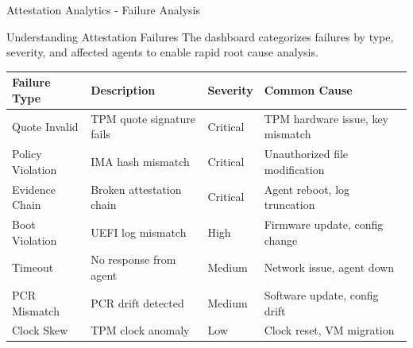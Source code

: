 \begin{frame}{Attestation Analytics - Failure Analysis}
  \begin{block}{Understanding Attestation Failures}
    \scriptsize
    The dashboard categorizes failures by type, severity, and affected agents to enable
    rapid root cause analysis.
  \end{block}

  \vspace{0.1cm}

  \scriptsize
  \begin{center}
    \begin{tabular}{|l|p{3cm}|l|p{3cm}|}
      \hline
      \textbf{Failure Type} & \textbf{Description} & \textbf{Severity} & \textbf{Common Cause} \\
      \hline
      \hline
      Quote Invalid & TPM quote signature fails & \textcolor{dangered}{Critical} & TPM hardware issue, key mismatch \\
      \hline
      Policy Violation & IMA hash mismatch & \textcolor{dangered}{Critical} & Unauthorized file modification \\
      \hline
      Evidence Chain & Broken attestation chain & \textcolor{dangered}{Critical} & Agent reboot, log truncation \\
      \hline
      Boot Violation & UEFI log mismatch & \textcolor{warningyellow}{High} & Firmware update, config change \\
      \hline
      Timeout & No response from agent & \textcolor{warningyellow}{Medium} & Network issue, agent down \\
      \hline
      PCR Mismatch & PCR drift detected & \textcolor{warningyellow}{Medium} & Software update, config drift \\
      \hline
      Clock Skew & TPM clock anomaly & \textcolor{infoblue}{Low} & Clock reset, VM migration \\
      \hline
    \end{tabular}
  \end{center}

\end{frame}

